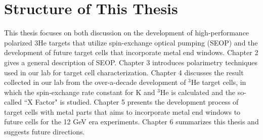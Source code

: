 \section{Structure of This Thesis}

This thesis focuses on both discussion on the development of high-performance polarized $3$He targets that utilize spin-exchange optical pumping (SEOP) and the development of future target cells that incorporate metal end windows. Chapter 2 gives a general description of SEOP. Chapter 3 introduces polarimetry techniques used in our lab for target cell characterization. Chapter 4 discusses the result collected in our lab from the over-a-decade development of $^3$He target cells, in which the spin-exchange rate constant for K and $^3$He is calculated and the so-called ``X Factor" is studied. Chapter 5 presents the development process of target cells with metal parts that aims to incorporate metal end windows to future cells for the 12 GeV era experiments. Chapter 6 summarizes this thesis and suggests future directions.













